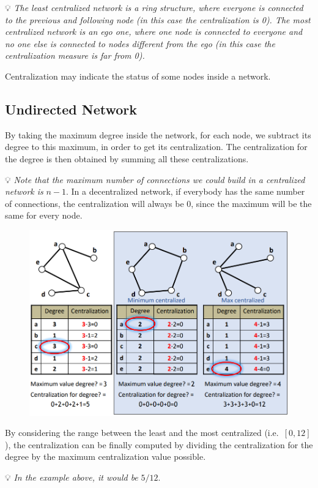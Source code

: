 \documentclass[
  notitlepage,
  onecolumn,
  openany]{book}
\begin{document}
💡 \emph{The least centralized network is a ring structure, where everyone is connected to the previous and following node (in this case the centralization is 0). The most centralized network is an ego one, where one node is connected to everyone and no one else is connected to nodes different from the ego (in this case the centralization measure is far from 0).}

Centralization may indicate the status of some nodes inside a network.

\hypertarget{undirected-network-2}{%
\subsection{Undirected Network}\label{undirected-network-2}}

By taking the maximum degree inside the network, for each node, we subtract its degree to this maximum, in order to get its centralization. The centralization for the degree is then obtained by summing all these centralizations.

💡 \emph{Note that the maximum number of connections we could build in a centralized network is} \(n-1\). In a decentralized network, if everybody has the same number of connections, the centralization will always be 0, since the maximum will be the same for every node.

\begin{figure}[h!]

{\centering \includegraphics[width=0.5\linewidth]{images/02-Basic Measures/Untitled} 

}

\end{figure}

By considering the range between the least and the most centralized (i.e.~\([0,12]\)), the centralization can be finally computed by dividing the centralization for the degree by the maximum centralization value possible.

💡 \emph{In the example above, it would be} \(5/12\).
\end{document}
